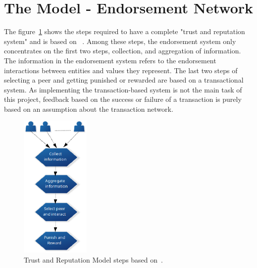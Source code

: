 \section{The Model - Endorsement Network}\label{sec:endorsementModel}
The figure~\ref{fig:truststep} shows the steps required to have a complete
"trust and reputation system" and is based on ~\cite{marmol2009security}. Among
these steps, the endorsement system only concentrates on the first two steps,
collection, and aggregation of information. The information in the endorsement
system refers to the endorsement interactions between entities and values they
represent. The last two steps of selecting a peer and getting punished or
rewarded are based on a transactional system. As implementing the
transaction-based system is not the main task of this project, feedback based
on the success or failure of a transaction is purely based on an assumption
about the transaction network. \par 
\begin{figure}
	\begin{center}
		\includegraphics[width=0.3\textwidth]{Images/TrustReputationSteps.eps}
		\caption{Trust and Reputation Model steps based
		on~\cite{marmol2009security}.}
		\label{fig:truststep}
	\end{center}
\end{figure}
